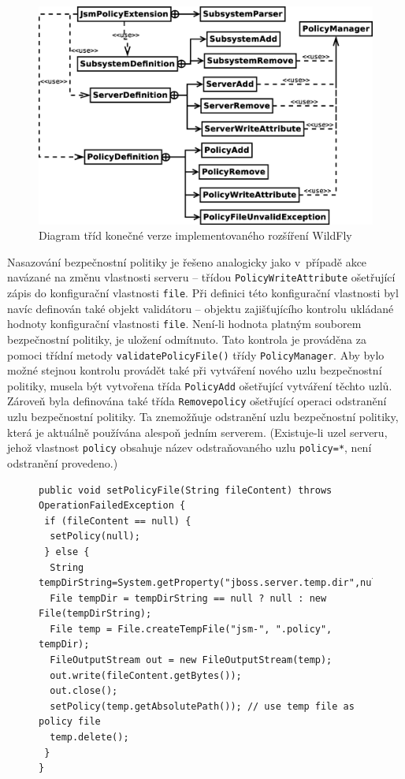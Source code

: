 \begin{figure}[ht]
  \centering
  \includegraphics[width=12cm]{fig/tridy2}
  \caption{Diagram tříd konečné verze implementovaného rozšíření WildFly}
  \label{tridy2}
\end{figure}

Nasazování bezpečnostní politiky je řešeno analogicky jako v~případě akce navázané na změnu vlastnosti serveru -- třídou {\tt PolicyWriteAttribute} ošetřující zápis do konfigurační vlastnosti {\tt file}.
Při definici této konfigurační vlastnosti byl navíc definován také objekt validátoru -- objektu zajišťujícího kontrolu ukládané hodnoty konfigurační vlastnosti {\tt file}. Není-li hodnota platným souborem bezpečnostní politiky, je uložení odmítnuto. Tato kontrola je prováděna za pomoci třídní metody {\tt validatePolicyFile()} třídy {\tt PolicyManager}.
Aby bylo možné stejnou kontrolu provádět také při vytváření nového uzlu bezpečnostní politiky, musela být vytvořena třída {\tt PolicyAdd} ošetřující vytváření těchto uzlů.
Zároveň byla definována také třída {\tt Removepolicy} ošetřující operaci odstranění uzlu bezpečnostní politiky. Ta znemožňuje odstranění uzlu bezpečnostní politiky, která je aktuálně používána alespoň jedním serverem. (Existuje-li uzel serveru, jehož vlastnost {\tt policy} obsahuje název odstraňovaného uzlu {\tt policy=*}, není odstranění provedeno.)

\begin{figure}[tbh]
\begin{lstlisting}[caption=Klíčová část metody {\tt setPolicyFile()} třídy {\tt PolicyManager}, label=setPolicyFile]
public void setPolicyFile(String fileContent) throws OperationFailedException {
 if (fileContent == null) {
  setPolicy(null);
 } else {
  String tempDirString=System.getProperty("jboss.server.temp.dir",null);
  File tempDir = tempDirString == null ? null : new File(tempDirString);
  File temp = File.createTempFile("jsm-", ".policy", tempDir);
  FileOutputStream out = new FileOutputStream(temp);
  out.write(fileContent.getBytes());
  out.close();
  setPolicy(temp.getAbsolutePath()); // use temp file as policy file
  temp.delete();
 }
}
\end{lstlisting}
\end{figure}

